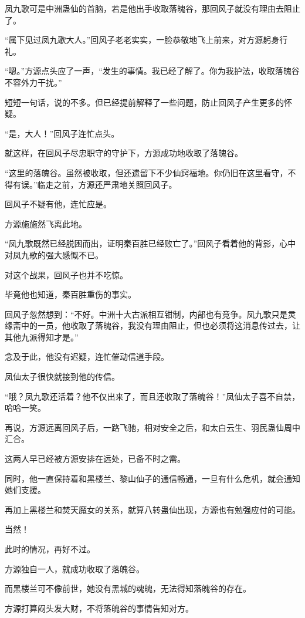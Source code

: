 \begin{this_body}
凤九歌可是中洲蛊仙的首脑，若是他出手收取落魄谷，那回风子就没有理由去阻止了。

“属下见过凤九歌大人。”回风子老老实实，一脸恭敬地飞上前来，对方源躬身行礼。

“嗯。”方源点头应了一声，“发生的事情。我已经了解了。你为我护法，收取落魄谷不容外力干扰。”

短短一句话，说的不多。但已经提前解释了一些问题，防止回风子产生更多的怀疑。

“是，大人！”回风子连忙点头。

就这样，在回风子尽忠职守的守护下，方源成功地收取了落魄谷。

“这里的落魄谷。虽然被收取，但还遗留下不少仙窍福地。你仍旧在这里看守，不得有误。”临走之前，方源还严肃地关照回风子。

回风子不疑有他，连忙应是。

方源施施然飞离此地。

“凤九歌既然已经脱困而出，证明秦百胜已经败亡了。”回风子看着他的背影，心中对凤九歌的强大感慨不已。

对这个战果，回风子也并不吃惊。

毕竟他也知道，秦百胜重伤的事实。

回风子忽然想到：“不好。中洲十大古派相互钳制，内部也有竞争。凤九歌只是灵缘斋中的一员，他收取了落魄谷，我没有理由阻止，但也必须将这消息传过去，让其他九派得知才是。”

念及于此，他没有迟疑，连忙催动信道手段。

凤仙太子很快就接到他的传信。

“哦？凤九歌还活着？他不仅出来了，而且还收取了落魄谷！”凤仙太子喜不自禁，哈哈一笑。

再说，方源远离回风子后，一路飞驰，相对安全之后，和太白云生、羽民蛊仙周中汇合。

这两人早已经被方源安排在远处，已备不时之需。

同时，他一直保持着和黑楼兰、黎山仙子的通信畅通，一旦有什么危机，就会通知她们支援。

再加上黑楼兰和焚天魔女的关系，就算八转蛊仙出现，方源也有勉强应付的可能。

当然！

此时的情况，再好不过。

方源独自一人，就成功收取了落魄谷。

而黑楼兰可不像前世，她没有黑城的魂魄，无法得知落魄谷的存在。

方源打算闷头发大财，不将落魄谷的事情告知对方。


\end{this_body}
